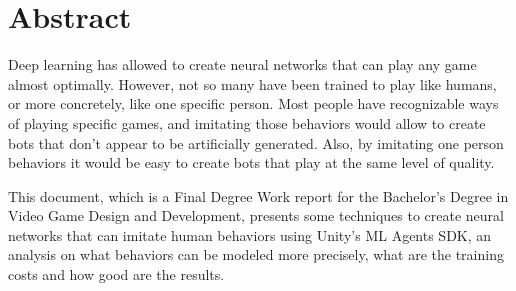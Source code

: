 %
%
%

\chapter*{Abstract}

Deep learning has allowed to create neural networks that can play any game almost optimally. However, not so many have been trained to play like humans, or more concretely, like one specific person. Most people have recognizable ways of playing specific games, and imitating those behaviors would allow to create bots that don't appear to be artificially generated. Also, by imitating one person behaviors it would be easy to create bots that play at the same level of quality.

This document, which is a Final Degree Work report for the Bachelor’s Degree in Video Game Design and Development, presents some techniques to create neural networks that can imitate human behaviors using Unity's ML Agents SDK, an analysis on what behaviors can be modeled more precisely, what are the training costs and how good are the results.

\cleardoublepage{}
